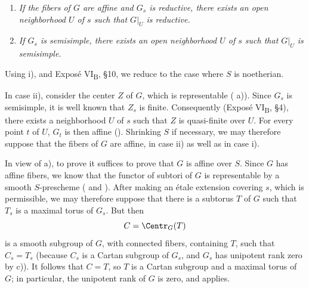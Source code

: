 \begin{enumerate}
\renewcommand{\labelenumi}{\textit{(\roman{enumi})}}
\item \textit{If the fibers of \(G\) are affine and \(G_s\) is
reductive, there exists an open neighborhood \(U\) of \(s\) such
that \(G|_U\) is reductive.}

\item \textit{If \(G_s\) is semisimple, there exists an open
neighborhood \(U\) of \(s\) such that \(G|_U\) is semisimple.}
\end{enumerate}

Using  i), and Exposé VI\textsubscript{B}, \S10, we
reduce to the case where \(S\) is noetherian.

In case ii), consider the center \(Z\) of \(G\), which is
representable ( a)). Since \(G_s\) is semisimple,
it is well known that \(Z_s\) is finite. Consequently (Exposé
VI\textsubscript{B}, \S4), there exists a neighborhood \(U\) of
\(s\) such that \(Z\) is quasi-finite over \(U\). For every point
\(t\) of \(U\), \(G_t\) is then affine ().
Shrinking \(S\) if necessary, we may therefore suppose that the
fibers of \(G\) are affine, in case ii) as well as in case i).

In view of a), to prove  it suffices to prove that \(G\) is
affine over \(S\). Since \(G\) has affine fibers, we know that the
functor of subtori of \(G\) is representable by a smooth
\(S\)-prescheme ( and ). After making an étale
extension covering \(s\), which is permissible, we may therefore
suppose that there is a subtorus \(T\) of \(G\) such that \(T_s\)
is a maximal torus of \(G_s\). But then
\[
  C=\Centr_G(T)
\]
is a smooth subgroup of \(G\), with connected fibers, containing
\(T\), such that \(C_s=T_s\) (because \(C_s\) is a Cartan
subgroup of \(G_s\), and \(G_s\) has unipotent rank zero by c)).
It follows that \(C=T\), so \(T\) is a Cartan subgroup and a
maximal torus of \(G\); in particular, the unipotent rank of \(G\)
is zero, and  applies.

